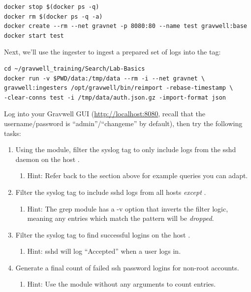 \begin{Verbatim}[breaklines=true]
docker stop $(docker ps -q)
docker rm $(docker ps -q -a)
docker create --rm --net gravnet -p 8080:80 --name test gravwell:base
docker start test
\end{Verbatim}

Next, we'll use the  ingester to ingest a prepared set of logs into the  tag:

\begin{Verbatim}[breaklines=true]
cd ~/gravwell_training/Search/Lab-Basics
docker run -v $PWD/data:/tmp/data --rm -i --net gravnet \
gravwell:ingesters /opt/gravwell/bin/reimport -rebase-timestamp \
-clear-conns test -i /tmp/data/auth.json.gz -import-format json
\end{Verbatim}

Log into your Gravwell GUI (\href{http://localhost:8080}{http://localhost:8080}, recall that the username/password is ``admin''/``changeme'' by default), then try the following tasks:

\begin{enumerate}
\item
  Using the  module, filter the syslog tag to only include logs from the sshd daemon on the
  host .
	\begin{enumerate}
	\item
	  Hint: Refer back to the section above for example queries you can adapt.
	\end{enumerate}
\item
  Filter the syslog tag to include sshd logs from all hosts \emph{except} .
	\begin{enumerate}
	\item
	  Hint: The grep module has a -v option that inverts the filter logic, meaning any entries which match the pattern will be \emph{dropped}.
	\end{enumerate}
\item
  Filter the syslog tag to find successful logins on the host .
	\begin{enumerate}
	\item
	  Hint: sshd will log ``Accepted'' when a user logs in.
	\end{enumerate}
\item
  Generate a final count of failed ssh password logins for non-root
  accounts.
	\begin{enumerate}
	\item
	  Hint: Use the  module without any arguments to count entries.
	\end{enumerate}
\end{enumerate}

